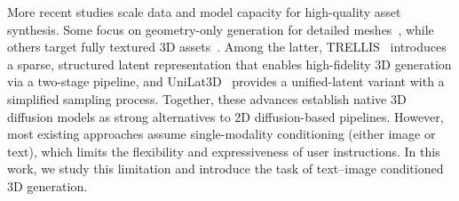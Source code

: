 More recent studies scale data and model capacity for high-quality asset synthesis. Some focus on geometry-only generation for detailed meshes~\cite{chen2025ultra3d,direct3d,direct3ds2,li2025sparc3d,ye2025hi3dgen}, while others target fully textured 3D assets~\cite{clay,3dtopiaxl,hunyuan3d2025hunyuan3d2.1,lai2025hunyuan3d2.5,step1x,zhou2025few}. Among the latter, TRELLIS~\cite{trellis} introduces a sparse, structured latent representation that enables high-fidelity 3D generation via a two-stage pipeline, and UniLat3D~\cite{unilat} provides a unified-latent variant with a simplified sampling process. Together, these advances establish native 3D diffusion models as strong alternatives to 2D diffusion-based pipelines. 
However, most existing approaches assume single-modality conditioning (either image or text), which limits the flexibility and expressiveness of user instructions. In this work, we study this limitation and introduce the task of text–image conditioned 3D generation.


